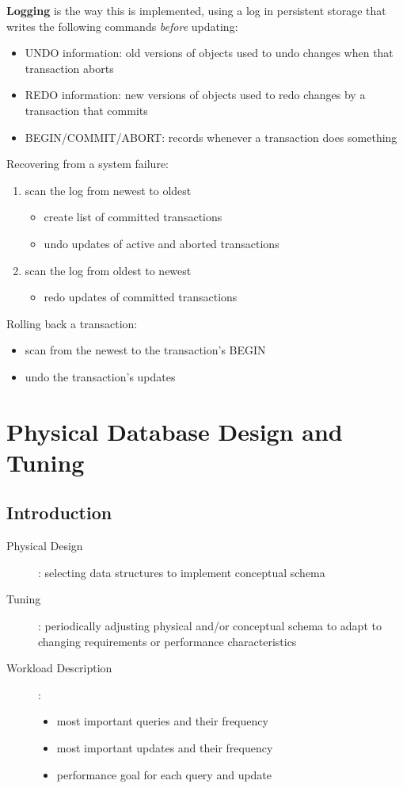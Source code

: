 \documentclass[]{article}
\theoremstyle{definition}
\begin{document}
	\textbf{Logging} is the way this is implemented, using a log in persistent storage that writes the following commands \textit{before} updating:
	\begin{itemize}
		\item UNDO information: old versions of objects used to undo changes when that transaction aborts
		\item REDO information: new versions of objects used to redo changes by a transaction that commits
		\item BEGIN/COMMIT/ABORT: records whenever a transaction does something
	\end{itemize}
	Recovering from a system failure:
	\begin{enumerate}
		\item scan the log from newest to oldest
			\begin{itemize}
				\item create list of committed transactions
				\item undo updates of active and aborted transactions
			\end{itemize}
		\item scan the log from oldest to newest
			\begin{itemize}
				\item redo updates of committed transactions
			\end{itemize}
	\end{enumerate}
	Rolling back a transaction:
	\begin{itemize}
		\item scan from the newest to the transaction's BEGIN
		\item undo the transaction's updates
	\end{itemize}

	\section{Physical Database Design and Tuning}

	\subsection{Introduction}
	\begin{description}
		\item[Physical Design]: selecting data structures to implement conceptual schema
		\item[Tuning]: periodically adjusting physical and/or conceptual schema to adapt to changing requirements or performance characteristics
		\item[Workload Description]: 
			\begin{itemize}
				\item most important queries and their frequency
				\item most important updates and their frequency
				\item performance goal for each query and update
			\end{itemize}
	\end{description}
\end{document}

